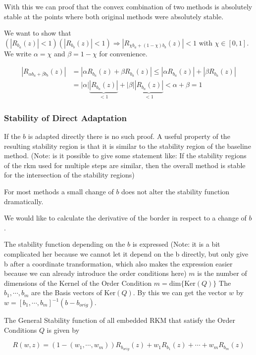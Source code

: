 \documentclass{article}
\begin{document}
With this we can proof that the convex combination of two methods is absolutely stable at the points where both original methods were absolutely stable.

We want to show that $(|R_{b_a}(z)|  < 1) (|R_{b_b}(z)| < 1) \Rightarrow |R_{\chi b_a +(1- \chi) b_b}(z)| < 1$ with $\chi \in [0,1]$.
We write $\alpha = \chi$ and $\beta = 1-\chi$ for convenience.

\begin{align}
|R_{\alpha b_a +\beta b_b}(z)| &= |\alpha R_{b_a}(z) + \beta R_{b_a}(z)| \leq |\alpha R_{b_a}(z)| + |\beta R_{b_a}(z)|\\
 &=| \alpha| \underbrace{|R_{b_a}(z)|}_{<1} + |\beta| \underbrace{|R_{b_a}(z)|}_{<1} < \alpha + \beta = 1
\end{align}



\subsubsection{Stability of  Direct Adaptation}
If the $b$ is adapted directly there is no such proof.
A useful property of the resulting stability region is that it is similar to the stability region of the baseline method. 
(Note: is it possible to give some statement like: If the stability regions of the rkm used for multiple steps are similar, then the overall method is stable for the intersection of the stability regions)

For most methods a small change of $b$ does not alter the stability function dramatically.

We would like to calculate the derivative of the border in respect to a change of $b$. 

The stability function depending on the $b$ is expressed (Note: it is a bit complicated her because we cannot let it depend on the b directly, but only give b after a coordinate transformation, which also makes the expression easier because we can already introduce the order conditions here)
$m$ is the number of dimensions of the Kernel of the Order Condition $m = \mathrm{dim}\{\mathrm{Ker} (Q) \}$
The $b_1,\cdots,b_m$  are the Basis vectors of $\mathrm{Ker} (Q)$. By this we can get the vector $w$ by $w = \left[b_1,\cdots,b_m\right]^{-1}(b-b_{orig})$.

The General Stability function of all embedded RKM that satisfy the Order Conditions $Q$ is given by 

\begin{equation}\label{eq:gen_stabilityf}
R(w,z) = (1-(w_1,\cdots,w_m))R_{b_{orig}}(z) + w_1 R_{b_1}(z) + \cdots + w_m R_{b_m}(z)
\end{equation}
\end{document}
